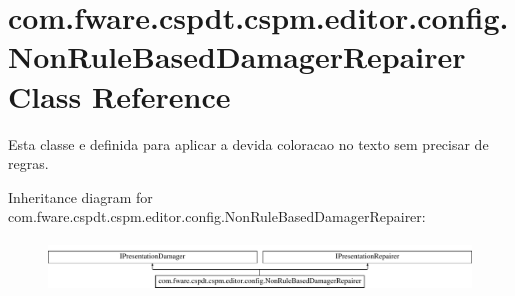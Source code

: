 \hypertarget{classcom_1_1fware_1_1cspdt_1_1cspm_1_1editor_1_1config_1_1_non_rule_based_damager_repairer}{}\section{com.\+fware.\+cspdt.\+cspm.\+editor.\+config.\+Non\+Rule\+Based\+Damager\+Repairer Class Reference}
\label{classcom_1_1fware_1_1cspdt_1_1cspm_1_1editor_1_1config_1_1_non_rule_based_damager_repairer}


Esta classe e definida para aplicar a devida coloracao no texto sem precisar de regras.  


Inheritance diagram for com.\+fware.\+cspdt.\+cspm.\+editor.\+config.\+Non\+Rule\+Based\+Damager\+Repairer\+:\begin{figure}[H]
\begin{center}
\leavevmode
\includegraphics[height=1.372549cm]{classcom_1_1fware_1_1cspdt_1_1cspm_1_1editor_1_1config_1_1_non_rule_based_damager_repairer}
\end{center}
\end{figure}
